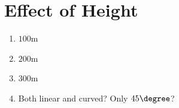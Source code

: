 \section{Effect of Height}

\begin{enumerate}
	\item $100$m
	\item $200$m
	\item $300$m
	\item Both linear and curved? Only $45\degree$?
\end{enumerate}